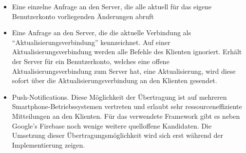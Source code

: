 \documentclass[parskip=full,11pt]{scrartcl}
\begin{document}
\begin{itemize}
    \item Eine einzelne Anfrage an den Server, die alle aktuell für das eigene
        Benutzerkonto vorliegenden Änderungen abruft
    \item Eine Anfrage an den Server, die die aktuelle Verbindung als
        \enquote{Aktualisierungsverbindung} kennzeichnet.
        Auf einer Aktualisierungsverbindung werden alle Befehle des Klienten
        ignoriert.
        Erhält der Server für ein Benutzerkonto, welches eine offene
        Aktualisierungsverbindung zum Server hat, eine Aktualisierung, wird
        diese sofort über die Aktualisierungsverbindung an den Klienten
        gesendet.
    \item Push-Notifications.
        Diese Möglichkeit der Übertragung ist auf mehreren
        Smartphone-Betriebssystemen vertreten und erlaubt sehr
        ressourceneffiziente Mitteilungen an den Klienten.
        Für das verwendete Framework gibt es neben Google's Firebase noch
        wenige weitere quelloffene Kandidaten.
        Die Umsetzung dieser Übertragungsmöglichkeit wird sich erst während
        der Implementierung zeigen.
\end{itemize}
\end{document}
